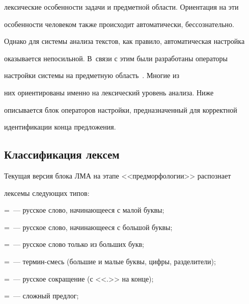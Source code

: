лексические особенности задачи и предметной области. Ориентация на эти 


особенности человеком также происходит автоматически, бессознательно. 


Однако для системы анализа текстов, как правило, автоматическая настройка 


оказывается непосильной. В~связи с этим были разработаны операторы 


настройки системы на предметную область~\cite{11-2-9, 10-2-9}. Многие из 


них ориентированы именно на лексический уровень анализа. Ниже 


описывается блок операторов настройки, предназначенный для корректной 


идентификации конца предложения.


   


\subsection{Классификация лексем}


   


   Текущая  версия  блока ЛМА на этапе <<предморфологии>> распознает 


лексемы следующих типов:


   


   =~--- русское слово, начинающееся с малой буквы;


   


   =~--- русское слово, начинающееся с большой буквы;


   


   =~--- русское слово только из больших букв;


   


   =~--- термин-смесь (большие и малые буквы, цифры, разделители);


   


   =~--- русское сокращение (с <<.>> на конце);


   


   =~--- сложный предлог;


   


